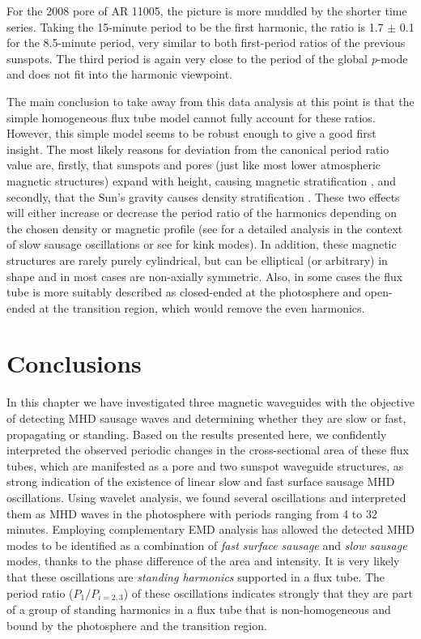 	For the 2008 pore of AR 11005, the picture is more muddled by the shorter time series.
	Taking the 15-minute period to be the first harmonic, the ratio is 1.7 $\pm$ 0.1 for the 8.5-minute period, very similar to both first-period ratios of the previous sunspots.
	The third period is again very close to the period of the global \textit{p}-mode and does not fit into the harmonic viewpoint.
	
	The main conclusion to take away from this data analysis at this point is that the simple homogeneous flux tube model cannot fully account for these ratios.
	However, this simple model seems to be robust enough to give a good first insight.
	The most likely reasons for deviation from the canonical period ratio value are, firstly, that sunspots and pores (just like most lower atmospheric magnetic structures) expand with height, causing magnetic stratification \citep{2008A&A...486.1015V,luna-cardozo}, and secondly, that the Sun's gravity causes density stratification \citep{Andries2009}.
	These two effects will either increase or decrease the period ratio of the harmonics depending on the chosen density or magnetic profile (see \citet{luna-cardozo} for a detailed analysis in the context of slow sausage oscillations or see \citet{2013SoPh..tmp..195E} for kink modes).
	In addition, these magnetic structures are rarely purely cylindrical, but can be elliptical (or arbitrary) in shape \citep[see][]{Ruderman2009,2009A&A...502..315M} and in most cases are non-axially symmetric.
	Also, in some cases the flux tube is more suitably described as closed-ended at the photosphere and open-ended at the transition region, which would remove the even harmonics.
	 
\section{Conclusions}

	In this chapter we have investigated three magnetic waveguides with the objective of detecting MHD sausage waves and determining whether they are slow or fast, propagating or standing.
	Based on the results presented here, we confidently interpreted the observed periodic changes in the cross-sectional area of these flux tubes, which are manifested as a pore and two sunspot waveguide structures, as strong indication of the existence of linear slow and fast surface sausage MHD oscillations.
	Using wavelet analysis, we found several oscillations and interpreted them as MHD waves in the photosphere with periods ranging from 4 to 32 minutes.
	Employing complementary EMD analysis has allowed the detected MHD modes to be identified as a combination of \textit{fast surface sausage} and \textit{slow sausage} modes, thanks to the phase difference of the area and intensity.
	It is very likely that these oscillations are \textit{standing harmonics} supported in a flux tube.
	The period ratio ($P_{1}/P_{i=2,3}$) of these oscillations indicates strongly that they are part of a group of standing harmonics in a flux tube that is non-homogeneous and bound by the photosphere and the transition region.